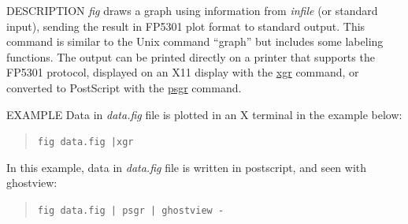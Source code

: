\begin{synopsis}
 \item[fig] [ --F $F$ ] [ --R $R$ ] [ --W $W$ ] [ --H $H$] [ --o $xo$ $yo$ ]
            [ --g $G$ ]  [ --p $P$ ] [ --j $J$ ]
 \item[\ ~~~] [ --s $S$ ] [ --f $file$ ] [ --t ] [ {\em infile} ]
\end{synopsis}

\begin{qsection}{DESCRIPTION}
{\em fig} draws a graph using information 
from {\em infile} (or standard input), 
sending the result in FP5301 plot format to standard output. 
This command is similar to the Unix command ``graph'' 
but includes some labeling functions. 
The output can be printed directly on a printer 
that supports the FP5301 protocol, 
displayed on an X11 display with the \hyperlink{xgr}{xgr} command, 
or converted to PostScript with the \hyperlink{psgr}{psgr} command.
\end{qsection}

\begin{options}
\end{options}

\begin{qsection}{EXAMPLE}
Data in {\em data.fig} file is plotted in an X terminal in the
example below:
\vspace{-3mm}
\begin{quote}
 \verb!fig data.fig |xgr!
\end{quote}
\vspace{-3mm}
In this example, data in {\em data.fig} file is written in postscript,
and seen with ghostview:
\vspace{-3mm}
\begin{quote}
 \verb!fig data.fig | psgr | ghostview -!
\end{quote}
\vspace{-3mm}
\end{qsection}

